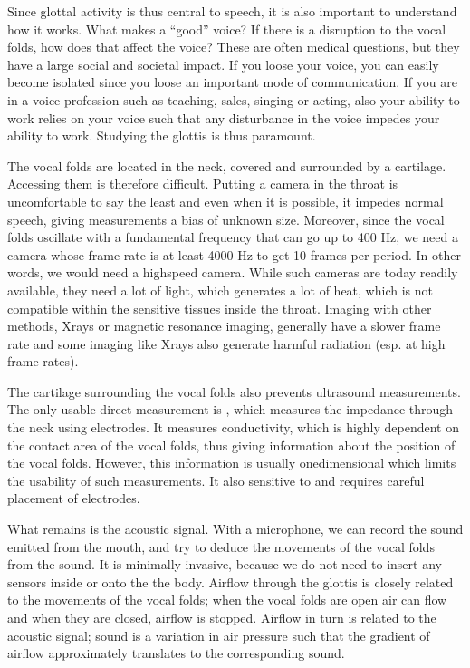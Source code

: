 \documentclass[letterpaper,10pt,english]{jupyterBook}
\begin{document}
\sphinxAtStartPar
Since glottal activity is thus central to speech, it is also important
to understand how it works. What makes a “good” voice? If there is a
disruption to the vocal folds, how does that affect the voice? These are
often medical questions, but they have a large social and societal
impact. If you loose your voice, you can easily become isolated since
you loose an important mode of communication. If you are in a voice
profession such as teaching, sales, singing or acting, also your ability
to work relies on your voice such that any disturbance in the voice
impedes your ability to work. Studying the glottis is thus paramount.

\sphinxAtStartPar
The vocal folds are located in the neck, covered and surrounded by a
cartilage. Accessing them is therefore difficult. Putting a camera in
the throat is uncomfortable to say the least and even when it is
possible, it impedes normal speech, giving measurements a bias of
unknown size. Moreover, since the vocal folds oscillate with a
fundamental frequency that can go up to 400 Hz, we need a camera whose
frame rate is at least 4000 Hz to get 10 frames per period. In other
words, we would need a high\sphinxhyphen{}speed camera. While such cameras are today
readily available, they need a lot of light, which generates a lot of
heat, which is not compatible within the sensitive tissues inside the
throat. Imaging with other methods, X\sphinxhyphen{}rays or magnetic resonance
imaging, generally have a slower frame rate and some imaging like X\sphinxhyphen{}rays
also generate harmful radiation (esp. at high frame rates).

\sphinxAtStartPar
The cartilage surrounding the vocal folds also prevents ultrasound
measurements. The only usable direct measurement is , which measures
the impedance through the neck using electrodes. It measures
conductivity, which is highly dependent on the contact area of the vocal
folds, thus giving information about the position of the vocal folds.
However, this information is usually one\sphinxhyphen{}dimensional which limits the
usability of such measurements. It also sensitive to and requires
careful placement of electrodes.

\sphinxAtStartPar
What remains is the acoustic signal. With a microphone, we can record
the sound emitted from the mouth, and try to deduce the movements of the
vocal folds from the sound. It is minimally invasive, because we do not
need to insert any sensors inside or onto the the body. Airflow through
the glottis is closely related to the movements of the vocal folds; when
the vocal folds are open air can flow and when they are closed, airflow
is stopped. Airflow in turn is related to the acoustic signal; sound is
a variation in air pressure such that the gradient of airflow
approximately translates to the corresponding sound.
\end{document}
